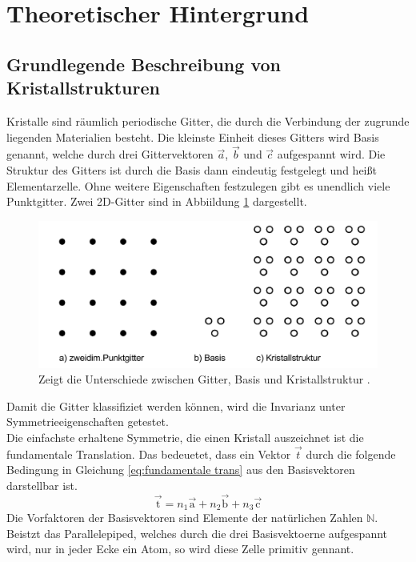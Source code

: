 ﻿\section{Theoretischer Hintergrund}
\label{sec:Theorie}
\subsection{Grundlegende Beschreibung von Kristallstrukturen}
Kristalle sind räumlich periodische Gitter, die durch die Verbindung der zugrunde liegenden Materialien besteht. 
Die kleinste Einheit dieses Gitters wird Basis genannt, welche durch drei Gittervektoren $\vec{a}$, $\vec{b}$ und $\vec{c}$ aufgespannt wird.
Die Struktur des Gitters ist durch die Basis dann eindeutig festgelegt und heißt Elementarzelle.
Ohne weitere Eigenschaften festzulegen gibt es unendlich viele Punktgitter.
Zwei 2D-Gitter sind in Abbiildung \ref{fig:2dgitter} dargestellt.
\begin{figure}
	\centering
	\includegraphics[width = \textwidth]{Abbildungen/2dgitter.png}
	\caption{Zeigt die Unterschiede zwischen Gitter, Basis und Kristallstruktur \cite{Anleitung}.}
	\label{fig:2dgitter}
\end{figure} 
Damit die Gitter klassifiziet werden können, wird die Invarianz unter Symmetrieeigenschaften getestet. \\
Die einfachste erhaltene Symmetrie, die einen Kristall auszeichnet ist die fundamentale Translation. Das bedeuetet, dass ein Vektor $\vec{t}$ durch die folgende Bedingung in Gleichung \ref{eq:fundamentale trans} aus den Basisvektoren darstellbar ist.
\begin{equation}
\vec{\text{t}} = n_1 \vec{\text{a}}+n_2 \vec{\text{b}}+n_3 \vec{\text{c}}
\label{eq:fundamentale trans}
\end{equation}
Die Vorfaktoren der Basisvektoren sind Elemente der natürlichen Zahlen $\mathbb{N}$.
Beistzt das Parallelepiped, welches durch die drei Basisvektoerne aufgespannt wird, nur in jeder Ecke ein Atom, so wird diese Zelle primitiv gennant.
